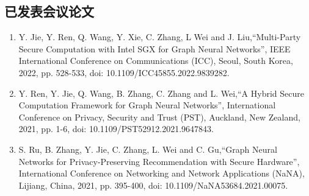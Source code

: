 
\begin{publications}

\section*{已发表会议论文}

\begin{enumerate}
\item Y. Jie, Y. Ren, Q. Wang, Y. Xie, C. Zhang, L Wei and J. Liu,“Multi-Party Secure Computation with Intel SGX for Graph Neural Networks”, IEEE International Conference on Communications (ICC), Seoul, South Korea, 2022, pp. 528-533, doi: 10.1109/ICC45855.2022.9839282.
\item Y. Ren, Y. Jie, Q. Wang, B. Zhang, C. Zhang and L. Wei,“A Hybrid Secure Computation Framework for Graph Neural Networks”, International Conference on Privacy, Security and Trust (PST), Auckland, New Zealand, 2021, pp. 1-6, doi: 10.1109/PST52912.2021.9647843.
\item S. Ru, B. Zhang, Y. Jie, C. Zhang, L. Wei and C. Gu,“Graph Neural Networks for Privacy-Preserving Recommendation with Secure Hardware”, International Conference on Networking and Network Applications (NaNA), Lijiang, China, 2021, pp. 395-400, doi: 10.1109/NaNA53684.2021.00075.
\end{enumerate}


%


\end{publications}
